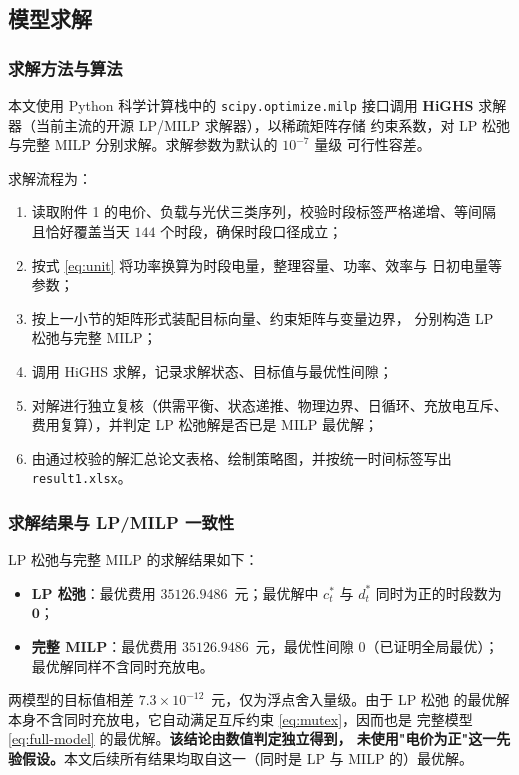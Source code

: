 \documentclass[withoutpreface,bwprint]{cumcmthesis}
\begin{document}
\subsection{模型求解}

\subsubsection{求解方法与算法}

本文使用 Python 科学计算栈中的 \texttt{scipy.optimize.milp} 接口调用
\textbf{HiGHS} 求解器（当前主流的开源 LP/MILP 求解器），以稀疏矩阵存储
约束系数，对 LP 松弛与完整 MILP 分别求解。求解参数为默认的 $10^{-7}$ 量级
可行性容差。

求解流程为：

\begin{enumerate}
  \item 读取附件 1 的电价、负载与光伏三类序列，校验时段标签严格递增、等间隔
        且恰好覆盖当天 $144$ 个时段，确保时段口径成立；
  \item 按式 \eqref{eq:unit} 将功率换算为时段电量，整理容量、功率、效率与
        日初电量等参数；
  \item 按上一小节的矩阵形式装配目标向量、约束矩阵与变量边界，
        分别构造 LP 松弛与完整 MILP；
  \item 调用 HiGHS 求解，记录求解状态、目标值与最优性间隙；
  \item 对解进行独立复核（供需平衡、状态递推、物理边界、日循环、充放电互斥、
        费用复算），并判定 LP 松弛解是否已是 MILP 最优解；
  \item 由通过校验的解汇总论文表格、绘制策略图，并按统一时间标签写出
        \texttt{result1.xlsx}。
\end{enumerate}

\subsubsection{求解结果与 LP/MILP 一致性}

LP 松弛与完整 MILP 的求解结果如下：

\begin{itemize}
  \item \textbf{LP 松弛}：最优费用 $35126.9486$~元；最优解中
        $c_t^*$ 与 $d_t^*$ 同时为正的时段数为 $\mathbf{0}$；
  \item \textbf{完整 MILP}：最优费用 $35126.9486$~元，最优性间隙
        $0$（已证明全局最优）；最优解同样不含同时充放电。
\end{itemize}

两模型的目标值相差 $7.3\times10^{-12}$~元，仅为浮点舍入量级。由于 LP 松弛
的最优解本身不含同时充放电，它自动满足互斥约束 \eqref{eq:mutex}，因而也是
完整模型 \eqref{eq:full-model} 的最优解。\textbf{该结论由数值判定独立得到，
未使用"电价为正"这一先验假设。}本文后续所有结果均取自这一（同时是 LP 与
MILP 的）最优解。
\end{document}

